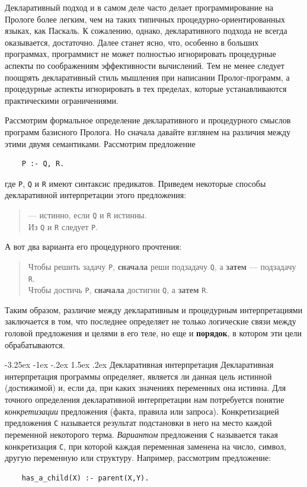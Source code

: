 \documentclass[12pt, openany, twoside]{book} %
\makeatletter
\renewcommand\section{\@startsection {section}{1}{\z@}%
                                   {-3.25ex \@plus -1ex \@minus -.2ex}%
                                   {1.5ex \@plus.2ex}%
                                   {\normalfont\large\bfseries}}
\makeatother
\begin{document}
Декларативный подход и в самом деле часто делает программирование на Прологе более легким, чем на таких типичных процедур\-но-ориентированных языках, как Паскаль. К сожалению, однако, декларативного подхода не всегда оказывается, достаточно. Далее станет ясно, что, особенно в больших программах, программист не может полностью игнорировать процедурные аспекты по соображениям эффективности вычислений. Тем не менее следует поощрять декларативный стиль мышления при написании Пролог-программ, а процедурные аспекты игнорировать в тех пределах, которые устанавливаются практическими ограничениями.

Рассмотрим формальное определение декларативного и процедурного смыслов программ базисного Пролога. Но сначала давайте взглянем на различия между этими двумя семантиками. Рассмотрим предложение
{\tt\begin{verbatim}
    Р :- Q, R.
\end{verbatim}}
\noindent где {\tt Р}, {\tt Q} и {\tt R} имеют синтаксис предикатов. Приведем некоторые способы декларативной интерпретации этого предложения:
\begin{quote}
 --- истинно, если {\tt Q} и {\tt R} истинны. \\
Из {\tt Q} и {\tt R} следует {\tt Р}.
\end{quote}

\noindent А вот два варианта его процедурного прочтения:

\begin{quote}
\noindent Чтобы решить задачу {\tt Р}, \textbf{сначала} реши подзадачу {\tt Q}, а {\bf затем} --- подзадачу {\tt R}. \\
Чтобы достичь {\tt Р}, \textbf{сначала} достигни {\tt Q},
а \textbf{затем} {\tt R}.
\end{quote}

Таким образом, различие между декларативным и процедурным интерпретациями заключается в том, что последнее определяет не только логические связи между головой предложения и целями в его теле, но еще и {\bf порядок}, в котором эти цели обрабатываются.

\section{Декларативная интерпретация}
Декларативная интерпретация программы определяет, является ли данная цель истинной (достижимой) и, если да, при каких значениях переменных она истинна. Для точного определения декларативной интерпретации нам потребуется понятие \emph{конкретизации} предложения (факта, правила или запроса). Конкретизацией предложения {\tt С} называется результат подстановки в него на место каждой переменной некоторого терма. \emph{Вариантом} предложения {\tt С} называется такая конкретизация {\tt С}, при которой каждая переменная заменена на число, символ, другую переменную или структуру. Например, рассмотрим предложение:
{\tt\begin{verbatim}
    has_a_child(X) :- parent(X,Y).
\end{verbatim}}
\end{document}
